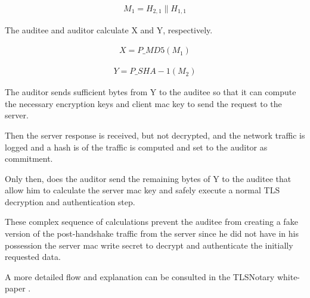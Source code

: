 \begin{ceqn}
    \begin{align}
        M_{1} = H_{2,1} \parallel H_{1,1}
    \end{align}
\end{ceqn}

The auditee and auditor calculate X and Y, respectively.

\begin{ceqn}
    \begin{align}
        X = P\_MD5(M_{1})
    \end{align}
\end{ceqn}

\begin{ceqn}
    \begin{align}
        Y = P\_SHA-1(M_{2})
    \end{align}
\end{ceqn}

The auditor sends sufficient bytes from Y to the auditee so that it can compute the necessary encryption keys and client mac key to send the request to the server. 

Then the server response is received, but not decrypted, and the network traffic is logged and a hash is of the traffic is computed and set to the auditor as commitment. 

Only then, does the auditor send the remaining bytes of Y to the auditee that allow him to calculate the server mac key and safely execute a normal TLS decryption and authentication step.

These complex sequence of calculations prevent the auditee from creating a fake version of the post-handshake traffic from the server since he did not have in his possession the server mac write secret to decrypt and authenticate the initially requested data.

A more detailed flow and explanation can be consulted in the TLSNotary white-paper \cite{2014TLSnotary-aSessions}.

   
